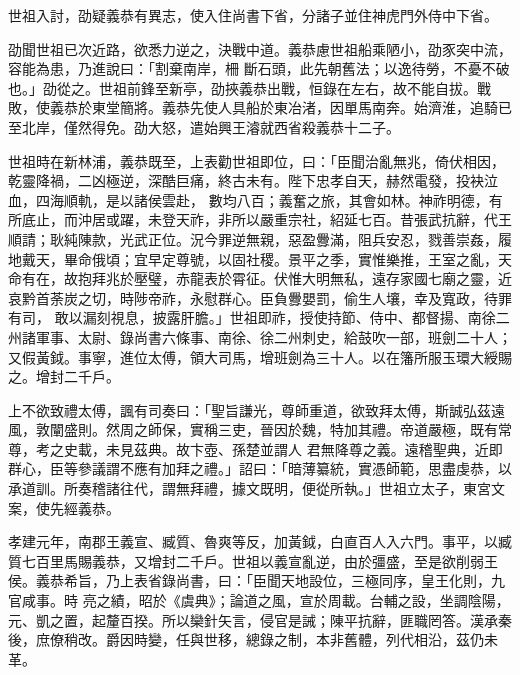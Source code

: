 \begin{pinyinscope}
 世祖入討，劭疑義恭有異志，使入住尚書下省，分諸子並住神虎門外侍中下省。



 劭聞世祖已次近路，欲悉力逆之，決戰中道。義恭慮世祖船乘陋小，劭豕突中流，容能為患，乃進說曰：「割棄南岸，柵
 斷石頭，此先朝舊法；以逸待勞，不憂不破也。」劭從之。世祖前鋒至新亭，劭挾義恭出戰，恒錄在左右，故不能自拔。戰敗，使義恭於東堂簡將。義恭先使人具船於東冶渚，因單馬南奔。始濟淮，追騎已至北岸，僅然得免。劭大怒，遣始興王濬就西省殺義恭十二子。



 世祖時在新林浦，義恭既至，上表勸世祖即位，曰：「臣聞治亂無兆，倚伏相因，乾靈降禍，二凶極逆，深酷巨痛，終古未有。陛下忠孝自天，赫然電發，投袂泣血，四海順軌，是以諸侯雲赴，
 數均八百；義奮之旅，其會如林。神祚明德，有所底止，而沖居或躍，未登天祚，非所以嚴重宗社，紹延七百。昔張武抗辭，代王順請；耿純陳款，光武正位。況今罪逆無親，惡盈釁滿，阻兵安忍，戮善崇姦，履地戴天，畢命俄頃；宜早定尊號，以固社稷。景平之季，實惟樂推，王室之亂，天命有在，故抱拜兆於壓璧，赤龍表於霄征。伏惟大明無私，遠存家國七廟之靈，近哀黔首荼炭之切，時陟帝祚，永慰群心。臣負釁嬰罰，偷生人壤，幸及寬政，待罪有司，
 敢以漏刻視息，披露肝膽。」世祖即祚，授使持節、侍中、都督揚、南徐二州諸軍事、太尉、錄尚書六條事、南徐、徐二州刺史，給鼓吹一部，班劍二十人；又假黃鉞。事寧，進位太傅，領大司馬，增班劍為三十人。以在籓所服玉環大綬賜之。增封二千戶。



 上不欲致禮太傅，諷有司奏曰：「聖旨謙光，尊師重道，欲致拜太傅，斯誠弘茲遠風，敦闡盛則。然周之師保，實稱三吏，晉因於魏，特加其禮。帝道嚴極，既有常尊，考之史載，未見茲典。故卞壺、孫楚並謂人
 君無降尊之義。遠稽聖典，近即群心，臣等參議謂不應有加拜之禮。」詔曰：「暗薄纂統，實憑師範，思盡虔恭，以承道訓。所奏稽諸往代，謂無拜禮，據文既明，便從所執。」世祖立太子，東宮文案，使先經義恭。



 孝建元年，南郡王義宣、臧質、魯爽等反，加黃鉞，白直百人入六門。事平，以臧質七百里馬賜義恭，又增封二千戶。世祖以義宣亂逆，由於彊盛，至是欲削弱王侯。義恭希旨，乃上表省錄尚書，曰：「臣聞天地設位，三極同序，皇王化則，九官咸事。時
 亮之績，昭於《虞典》；論道之風，宣於周載。台輔之設，坐調陰陽，元、凱之置，起釐百揆。所以欒針矢言，侵官是誡；陳平抗辭，匪職罔答。漢承秦後，庶僚稍改。爵因時變，任與世移，總錄之制，本非舊體，列代相沿，茲仍未革。




\end{pinyinscope}
